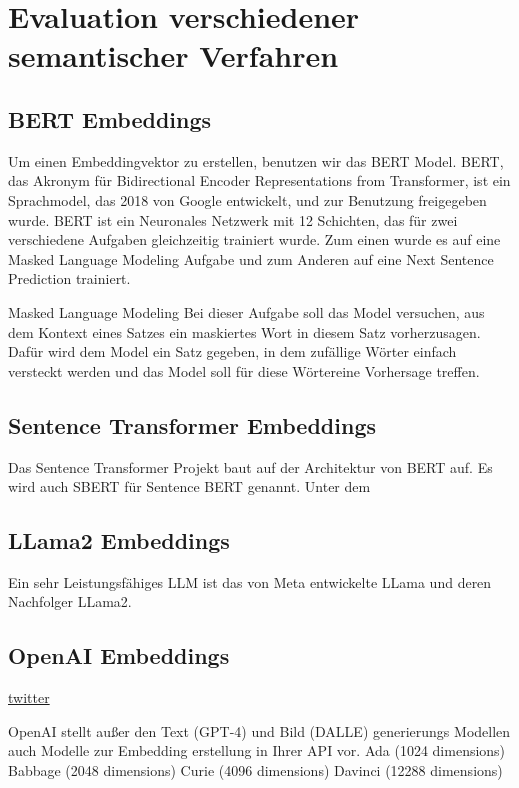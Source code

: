 \chapter{Evaluation verschiedener semantischer Verfahren}\label{ch:experiments}


\section{BERT Embeddings}

Um einen Embeddingvektor zu erstellen, benutzen wir das BERT Model. BERT, das Akronym für Bidirectional Encoder Representations from Transformer, ist ein Sprachmodel, das 2018 von Google entwickelt, und zur Benutzung freigegeben wurde. 
BERT ist ein Neuronales Netzwerk mit 12 Schichten, das für zwei verschiedene Aufgaben gleichzeitig trainiert wurde. Zum einen wurde es auf eine Masked Language Modeling Aufgabe und zum Anderen auf eine Next Sentence Prediction trainiert. 

Masked Language Modeling
Bei dieser Aufgabe soll das Model versuchen, aus dem Kontext eines Satzes ein maskiertes Wort in diesem Satz vorherzusagen. Dafür wird dem Model ein Satz gegeben, in dem zufällige Wörter einfach versteckt werden und das Model soll für diese Wörtereine Vorhersage treffen. 


\section{Sentence Transformer Embeddings}

Das Sentence Transformer Projekt baut auf der Architektur von BERT auf. 
Es wird auch SBERT für Sentence BERT genannt. 
Unter dem 

\section{LLama2 Embeddings}

Ein sehr Leistungsfähiges LLM ist das von Meta entwickelte LLama und deren Nachfolger LLama2. \cite{touvron2023}

\section{OpenAI Embeddings}

\href{https://twitter.com/Nils_Reimers/status/1487014195568775173}{twitter}



OpenAI stellt außer den Text (GPT-4) und Bild (DALLE) generierungs Modellen auch Modelle zur Embedding erstellung in Ihrer API vor.
Ada (1024 dimensions)
Babbage (2048 dimensions)
Curie (4096 dimensions)
Davinci (12288 dimensions)

